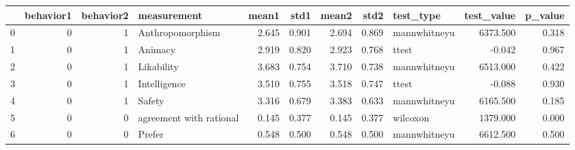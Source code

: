 \begin{tabular}{lrrlrrrrlrr}
\toprule
{} &  behavior1 &  behavior2 &              measurement &  mean1 &   std1 &  mean2 &   std2 &     test\_type &  test\_value &  p\_value \\
\midrule
0 &          0 &          1 &         Anthropomorphism &  2.645 &  0.901 &  2.694 &  0.869 &  mannwhitneyu &    6373.500 &    0.318 \\
1 &          0 &          1 &                  Animacy &  2.919 &  0.820 &  2.923 &  0.768 &         ttest &      -0.042 &    0.967 \\
2 &          0 &          1 &               Likability &  3.683 &  0.754 &  3.710 &  0.738 &  mannwhitneyu &    6513.000 &    0.422 \\
3 &          0 &          1 &             Intelligence &  3.510 &  0.755 &  3.518 &  0.747 &         ttest &      -0.088 &    0.930 \\
4 &          0 &          1 &                   Safety &  3.316 &  0.679 &  3.383 &  0.633 &  mannwhitneyu &    6165.500 &    0.185 \\
5 &          0 &          0 &  agreement with rational &  0.145 &  0.377 &  0.145 &  0.377 &      wilcoxon &    1379.000 &    0.000 \\
6 &          0 &          0 &                   Prefer &  0.548 &  0.500 &  0.548 &  0.500 &  mannwhitneyu &    6612.500 &    0.500 \\
\bottomrule
\end{tabular}
